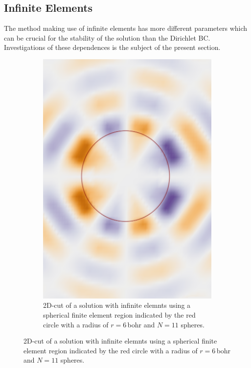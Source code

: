 \subsection{Infinite Elements}
\label{sec:iBCbench}
The method making use of infinite elements has more different parameters which can be crucial for the stability of the solution than the Dirichlet BC.
Investigations of these dependences is the subject of the present section.


\begin{figure}%
\begin{subfigure}{0.5\textwidth}
   \includegraphics[width=\textwidth]{Figures/BC/plane_fin}
   \caption{2D-cut of a solution with infinite elemnts using a spherical finite element region indicated by the red circle with a radius of $r=6\,$bohr and $N=11$ spheres.}
\end{subfigure}

\end{figure}
